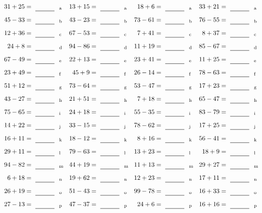 \documentclass
[
  draft    = true,
  fontsize = 11pt,
  parskip  = half-
]
{scrartcl}
\begin{document}
\clearpage
\begin{align*}
    \pline{31+25}&=\rline{a}
  & \pline{13+15}&=\rline{a}
  & \pline{18+6}&=\rline{a}
  & \pline{33+21}&=\rline{a} \\[1ex]
    \pline{45-33}&=\rline{b}
  & \pline{43-23}&=\rline{b}
  & \pline{73-61}&=\rline{b}
  & \pline{76-55}&=\rline{b} \\[1ex]
    \pline{12+36}&=\rline{c}
  & \pline{67-53}&=\rline{c}
  & \pline{7+41}&=\rline{c}
  & \pline{8+37}&=\rline{c} \\[1ex]
    \pline{24+8}&=\rline{d}
  & \pline{94-86}&=\rline{d}
  & \pline{11+19}&=\rline{d}
  & \pline{85-67}&=\rline{d} \\[1ex]
    \pline{67-49}&=\rline{e}
  & \pline{22+13}&=\rline{e}
  & \pline{23+41}&=\rline{e}
  & \pline{11+25}&=\rline{e} \\[1ex]
    \pline{23+49}&=\rline{f}
  & \pline{45+9}&=\rline{f}
  & \pline{26-14}&=\rline{f}
  & \pline{78-63}&=\rline{f} \\[1ex]
    \pline{51+12}&=\rline{g}
  & \pline{73-64}&=\rline{g}
  & \pline{53-47}&=\rline{g}
  & \pline{17+23}&=\rline{g} \\[1ex]
    \pline{43-27}&=\rline{h}
  & \pline{21+51}&=\rline{h}
  & \pline{7+18}&=\rline{h}
  & \pline{65-47}&=\rline{h} \\[1ex]
    \pline{75-65}&=\rline{i}
  & \pline{24+18}&=\rline{i}
  & \pline{55-35}&=\rline{i}
  & \pline{83-79}&=\rline{i} \\[1ex]
    \pline{14+22}&=\rline{j}
  & \pline{33-15}&=\rline{j}
  & \pline{78-62}&=\rline{j}
  & \pline{17+25}&=\rline{j} \\[1ex]
    \pline{16+11}&=\rline{k}
  & \pline{18-12}&=\rline{k}
  & \pline{8+16}&=\rline{k}
  & \pline{56-41}&=\rline{k} \\[1ex]
    \pline{29+11}&=\rline{l}
  & \pline{79-63}&=\rline{l}
  & \pline{13+23}&=\rline{l}
  & \pline{18+9}&=\rline{l} \\[1ex]
    \pline{94-82}&=\rline{m}
  & \pline{44+19}&=\rline{m}
  & \pline{11+13}&=\rline{m}
  & \pline{29+27}&=\rline{m} \\[1ex]
    \pline{6+18}&=\rline{n}
  & \pline{19+62}&=\rline{n}
  & \pline{12+23}&=\rline{n}
  & \pline{17+11}&=\rline{n} \\[1ex]
    \pline{26+19}&=\rline{o}
  & \pline{51-43}&=\rline{o}
  & \pline{99-78}&=\rline{o}
  & \pline{16+33}&=\rline{o} \\[1ex]
    \pline{27-13}&=\rline{p}
  & \pline{47-37}&=\rline{p}
  & \pline{24+6}&=\rline{p}
  & \pline{16+16}&=\rline{p}
\end{align*}
\end{document}
